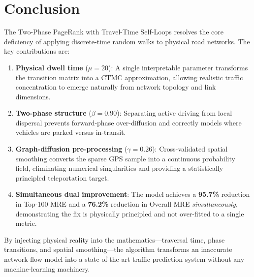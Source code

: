 \documentclass[12pt,a4paper]{article}
\theoremstyle{definition}
\theoremstyle{plain}
\begin{document}
\section{Conclusion}

The Two-Phase PageRank with Travel-Time Self-Loops resolves the core deficiency of
applying discrete-time random walks to physical road networks. The key contributions are:

\begin{enumerate}[label=\textbf{\arabic*.}]
  \item \textbf{Physical dwell time} ($\mu\!=\!20$): A single interpretable parameter
    transforms the transition matrix into a CTMC approximation, allowing realistic traffic
    concentration to emerge naturally from network topology and link dimensions.

  \item \textbf{Two-phase structure} ($\beta\!=\!0.90$): Separating active driving from
    local dispersal prevents forward-phase over-diffusion and correctly models
    where vehicles are parked versus in-transit.

  \item \textbf{Graph-diffusion pre-processing} ($\gamma\!=\!0.26$): Cross-validated
    spatial smoothing converts the sparse GPS sample into a continuous probability field,
    eliminating numerical singularities and providing a statistically principled
    teleportation target.

  \item \textbf{Simultaneous dual improvement}: The model achieves a \textbf{95.7\%}
    reduction in Top-100 MRE and a \textbf{76.2\%} reduction in Overall MRE
    \emph{simultaneously}, demonstrating the fix is physically principled and not
    over-fitted to a single metric.
\end{enumerate}

\begin{result}
  By injecting physical reality into the mathematics---traversal time, phase transitions,
  and spatial smoothing---the algorithm transforms an inaccurate network-flow model into
  a state-of-the-art traffic prediction system without any machine-learning machinery.
\end{result}
\end{document}
